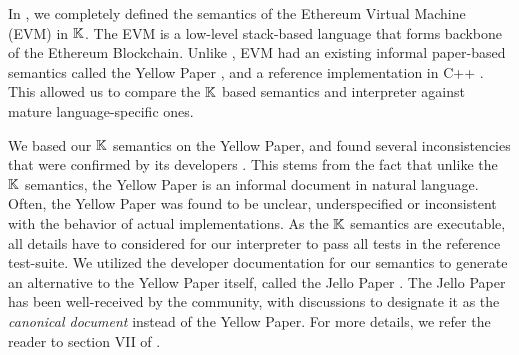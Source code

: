 In \cite{HildenbrandtCSF18},
we completely defined the semantics of the Ethereum Virtual Machine (EVM)
in $\mathbb{K}{}$. The EVM is a low-level stack-based language
that forms backbone of the Ethereum Blockchain. Unlike \MediK{},
EVM had an existing informal paper-based semantics
called the Yellow Paper \cite{evmYellowpaperUrl},
and a reference implementation in C++ \cite{cppEthereumUrl}.
This allowed us to compare the $\mathbb{K}$ based semantics
and interpreter against mature language-specific ones.


We based our $\mathbb{K}$ semantics on the Yellow Paper, and
found several inconsistencies that were confirmed by its developers \cite{HildenbrandtCSF18}.
This stems from the fact that unlike the $\mathbb{K}$ semantics,
the Yellow Paper is an informal document in natural language.
Often, the Yellow Paper was found to be unclear, underspecified
or inconsistent with the behavior of actual implementations.
As the $\mathbb{K}$ semantics are executable, all details have to
considered for our interpreter to pass all tests in the reference
test-suite. We utilized the developer documentation for our semantics
to generate an alternative to the Yellow Paper itself, called the Jello Paper
\cite{evmJellopaperUrl}. The Jello Paper has been well-received by the
community, with discussions to designate it as the \emph{canonical document}
instead of the Yellow Paper. For more details, we refer the reader to
section VII of \cite{HildenbrandtCSF18}.

